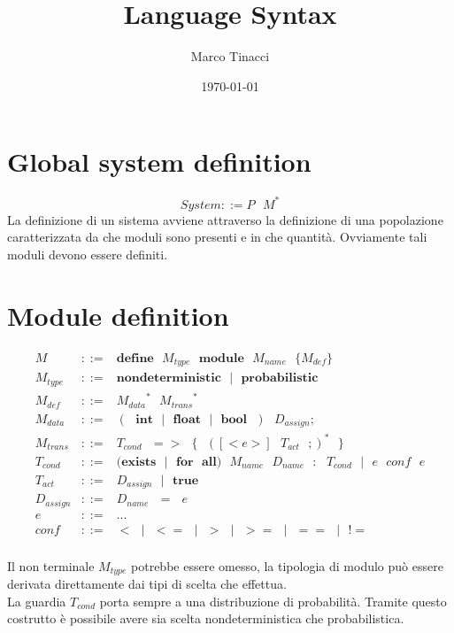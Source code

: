 \documentclass{article}
\title{Language Syntax}
\author{Marco Tinacci}
\date{\today}
\begin{document}
\maketitle
\tableofcontents
\section{Global system definition}
$$ System ::= P \mbox{ } M^* $$
La definizione di un sistema avviene attraverso la definizione di una popolazione caratterizzata da che moduli sono presenti e in che quantità. Ovviamente tali moduli devono essere definiti.
\section{Module definition}
$$
\begin{array}{lll}
M &::=&  \mathbf{define} \mbox{ } M_{type} \mbox{ } \mathbf{module} \mbox{ } M_{name} \mbox{ } \mathbf{\{} M_{def} \mathbf{\}} \\
M_{type} &::=& \mathbf{nondeterministic} \mbox{ }|\mbox{ } \mathbf{probabilistic} \\
M_{def} &::=& {M_{data}}^* \mbox{ } {M_{trans}}^* \\
M_{data} &::=& (\mbox{ }\mathbf{int}\mbox{ }|\mbox{ }\mathbf{float}\mbox{ }|\mbox{ }\mathbf{bool}\mbox{ })\mbox{ } D_{assign} \mathbf{;} \\
M_{trans} &::=& T_{cond} \mbox{ } \mathbf{=>} \mbox{ } \mathbf{\{} \mbox{ }([\mathbf{<} e \mathbf{>}] \mbox{ } T_{act}\mbox{ } \mathbf{;} )^* \mbox{ }\mathbf{\}} \\
T_{cond} &::=& (\mathbf{exists}\mbox{ }|\mbox{ }\mathbf{for} \mbox{ } \mathbf{all}) \mbox{ } M_{name} \mbox{ } D_{name} \mbox{ } \mathbf{:} \mbox{ } T_{cond} \mbox{ }|\mbox{ } e \mbox{ } conf \mbox{ } e \\
T_{act} &::=& D_{assign} \mbox{ }|\mbox{ } \mathbf{true} \\
D_{assign} &::=& D_{name} \mbox{ }\mathbf{=}\mbox{ } e \\
e &::=& ... \\
conf &::=& \mathbf{<} \mbox{ }|\mbox{ } \mathbf{<=} \mbox{ }|\mbox{ } \mathbf{>} \mbox{ }|\mbox{ } \mathbf{>=} \mbox{ }|\mbox{ } \mathbf{==} \mbox{ }|\mbox{ } \mathbf{!=} \\
\end{array}
$$

Il non terminale $M_{type}$ potrebbe essere omesso, la tipologia di modulo può essere derivata direttamente dai tipi di scelta che effettua. \\
La guardia $T_{cond}$ porta sempre a una distribuzione di probabilità. Tramite questo costrutto è possibile avere sia scelta nondeterministica che probabilistica. \\
\end{document}
